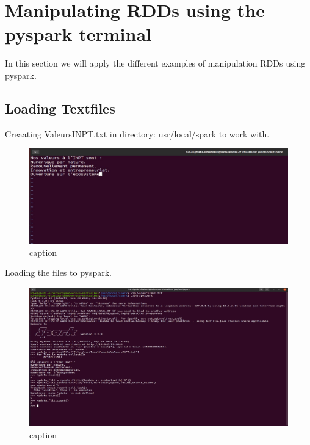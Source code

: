 \chapter{Manipulating RDDs using the pyspark terminal}
\par In this section we will apply the different examples of manipulation RDDs using pyspark.
\begin{spacing}{1.2}
\section{Loading Textfiles}

\par Creaating ValeursINPT.txt in directory: usr/local/spark to work with.
\\
\begin{figure}[!htb] 
\begin{center} 
\includegraphics[width=1\linewidth]{Big_Data/Spark/Manipulating RDDs using pyspark/Creating ValeursINPT file.jpg} 
\end{center} 
\caption{caption} 
\end{figure} 
\FloatBarrier



\par Loading the files to pyspark.
\\
\begin{figure}[!htb] 
\begin{center} 
\includegraphics[width=1\linewidth]{Big_Data/Spark/Manipulating RDDs using pyspark/Loading file in pyspark.jpg} 
\end{center} 
\caption{caption} 
\end{figure} 
\FloatBarrier


\end{spacing}
